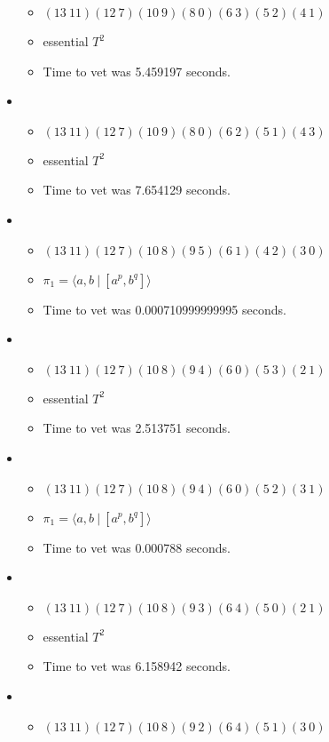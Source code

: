 \documentclass{article}
\begin{document}
\begin{itemize}
\begin{itemize}
      \item $(13\ 11)(12\ 7)(10\ 9)(8\ 0)(6\ 3)(5\ 2)(4\ 1)$
      \item essential $T^2$
      \item Time to vet was 5.459197 seconds.
\end{itemize}
\item \begin{itemize}
      \item $(13\ 11)(12\ 7)(10\ 9)(8\ 0)(6\ 2)(5\ 1)(4\ 3)$
      \item essential $T^2$
      \item Time to vet was 7.654129 seconds.
\end{itemize}
\item \begin{itemize}
      \item $(13\ 11)(12\ 7)(10\ 8)(9\ 5)(6\ 1)(4\ 2)(3\ 0)$
      \item $\pi_1 = \langle a,b\ |\ [a^p,b^q]\rangle$
      \item Time to vet was 0.000710999999995 seconds.
\end{itemize}
\item \begin{itemize}
      \item $(13\ 11)(12\ 7)(10\ 8)(9\ 4)(6\ 0)(5\ 3)(2\ 1)$
      \item essential $T^2$
      \item Time to vet was 2.513751 seconds.
\end{itemize}
\item \begin{itemize}
      \item $(13\ 11)(12\ 7)(10\ 8)(9\ 4)(6\ 0)(5\ 2)(3\ 1)$
      \item $\pi_1 = \langle a,b\ |\ [a^p,b^q]\rangle$
      \item Time to vet was 0.000788 seconds.
\end{itemize}
\item \begin{itemize}
      \item $(13\ 11)(12\ 7)(10\ 8)(9\ 3)(6\ 4)(5\ 0)(2\ 1)$
      \item essential $T^2$
      \item Time to vet was 6.158942 seconds.
\end{itemize}
\item \begin{itemize}
      \item $(13\ 11)(12\ 7)(10\ 8)(9\ 2)(6\ 4)(5\ 1)(3\ 0)$

\end{itemize}
\end{itemize}
\end{document}
